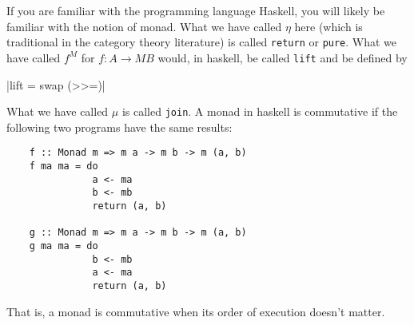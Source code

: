 \documentclass[DynamicalBook]{subfiles}
\begin{document}
\begin{remark}\label{rmk.haskell_do}
  If you are familiar with the programming language Haskell, you will likely be
  familiar with the notion of monad. What we have called $\eta$ here (which is
  traditional in the category theory literature) is called
  \texttt{return} or \texttt{pure}. What we have
  called $f^M$ for $f : A \to MB$ would, in haskell, be called
  \texttt{lift} and be defined by

  |lift = swap (>>=)|

  What we have called $\mu$ is called \texttt{join}. A monad in haskell is commutative if the following two programs have the same
  results:
  \begin{verbatim}
    f :: Monad m => m a -> m b -> m (a, b)
    f ma ma = do
               a <- ma
               b <- mb
               return (a, b)

    g :: Monad m => m a -> m b -> m (a, b)
    g ma ma = do
               b <- mb
               a <- ma
               return (a, b)
  \end{verbatim}
  That is, a monad is commutative when its order of execution doesn't matter. 
\end{remark}
\end{document}
